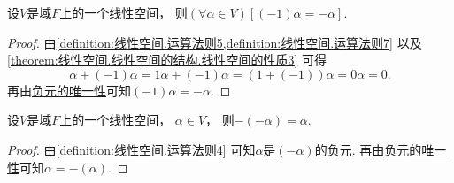 \begin{property}%
设\(V\)是域\(F\)上的一个线性空间，
则\((\forall\alpha\in V)[(-1)\alpha=-\alpha]\).
\begin{proof}
由\cref{definition:线性空间.运算法则5,definition:线性空间.运算法则7}
以及\cref{theorem:线性空间.线性空间的结构.线性空间的性质3}
可得\begin{equation*}
	\alpha + (-1)\alpha
	= 1\alpha + (-1)\alpha
	= (1+(-1))\alpha
	= 0\alpha
	= 0.
\end{equation*}
再由\hyperref[theorem:线性空间.线性空间的结构.线性空间的性质2]{负元的唯一性}可知\((-1)\alpha = -\alpha\).
\end{proof}
\end{property}

\begin{property}
设\(V\)是域\(F\)上的一个线性空间，
\(\alpha \in V\)，
则\(-(-\alpha) = \alpha\).
\begin{proof}
由\cref{definition:线性空间.运算法则4}
可知\(\alpha\)是\((-\alpha)\)的负元.
再由\hyperref[theorem:线性空间.线性空间的结构.线性空间的性质2]{负元的唯一性}可知\(\alpha = -(\alpha)\).
\end{proof}
\end{property}

